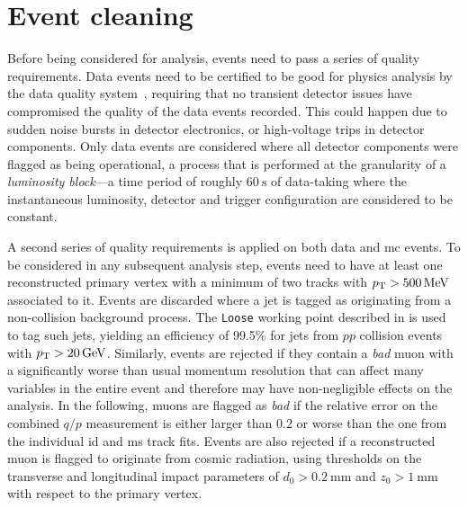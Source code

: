 \section{Event cleaning}

Before being considered for analysis, events need to pass a series of quality requirements. Data events need to be certified to be good for physics analysis by the data quality system~\cite{DAPR-2018-01}, requiring that no transient detector issues have compromised the quality of the data events recorded. This could happen due to \eg sudden noise bursts in detector electronics, or high-voltage trips in detector components. Only data events are considered where all detector components were flagged as being operational, a process that is performed at the granularity of a \textit{luminosity block}---a time period of roughly $\SI{60}{\second}$ of data-taking where the instantaneous luminosity, detector and trigger configuration are considered to be constant. 

A second series of quality requirements is applied on both data and \gls{mc} events. To be considered in any subsequent analysis step, events need to have at least one reconstructed primary vertex with a minimum of two tracks with $\pt > \SI{500}{\MeV}$ associated to it. Events are discarded where a jet is tagged as originating from a non-collision background process. The \texttt{Loose} working point described in \cite{ATLAS-CONF-2015-029} is used to tag such jets, yielding an efficiency of 99.5\% for jets from $pp$ collision events with $\pt>\SI{20}{\GeV}$. Similarly, events are rejected if they contain a \textit{bad} muon with a significantly worse than usual momentum resolution that can affect many variables in the entire event and therefore may have non-negligible effects on the analysis. In the following, muons are flagged as \textit{bad} if the relative error on the combined $q/p$ measurement is either larger than $0.2$ or worse than the one from the individual \gls{id} and \gls{ms} track fits. Events are also rejected if a reconstructed muon is flagged to originate from cosmic radiation, using thresholds on the transverse and longitudinal impact parameters of $d_0 > \SI{0.2}{\milli\meter}$ and $z_0 > \SI{1}{\milli\meter}$ with respect to the primary vertex.



